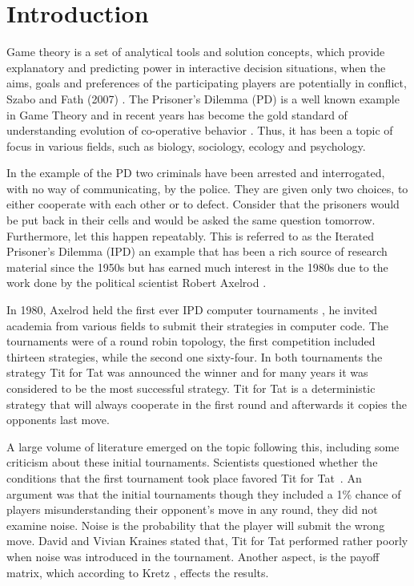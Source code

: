 \chapter{Introduction}
Game theory is a set of analytical tools and solution concepts, which provide
explanatory and predicting power in interactive decision situations, when the
aims, goals and preferences of the participating players are potentially in
conflict, Szabo and Fath (2007) \cite{Szabo2007}. The Prisoner's Dilemma (PD) is a well
known example in Game Theory and in recent years has become the gold standard of
understanding evolution of co-operative behavior \cite{Lorberbaum1994}.
Thus, it has been a topic of focus in various fields, such as biology,
sociology, ecology and psychology.

In the example of the PD two criminals have been arrested
and interrogated, with no way of communicating, by the police. They are given
only two choices, to either cooperate with each other or to defect.
Consider that the prisoners would be put back in their cells and would be asked
the same question tomorrow. Furthermore, let this happen repeatably. This is
referred to as the Iterated Prisoner's Dilemma (IPD) an example that has been a
rich source of research material since the 1950s but has earned much interest in
the 1980s due to the work done by the political scientist Robert Axelrod
\cite{Axelrod1980a, Axelrod1980b, Axelrod1981}.

In 1980, Axelrod held the first ever IPD computer tournaments \cite{Axelrod1980a,
Axelrod1980b}, he invited
academia from various fields to submit their strategies in computer code. The
tournaments were of a round robin topology, the first competition included thirteen
strategies, while the second one sixty-four. In both tournaments the strategy Tit
for Tat was announced the winner and for many years it was considered to be the
most successful strategy. Tit for Tat is a deterministic strategy that will
always cooperate in the first round and afterwards it copies the opponents last
move.

A large volume of literature emerged on the topic following this, including some
criticism about these initial tournaments. Scientists questioned whether the
conditions that the first tournament took place favored Tit for Tat~\cite{RePEc:mtp:titles:0262023636}.
An argument was that the initial tournaments though they included
a 1\% chance of players misunderstanding their opponent's move in any round, they did not examine noise. Noise is the probability
that the player will submit the wrong move. David and Vivian Kraines \cite{kraines-1989a}
stated that, Tit for Tat performed rather poorly when noise was introduced in the tournament.
Another aspect, is the payoff matrix, which according to Kretz \cite{Kretz2011},
effects the results.

